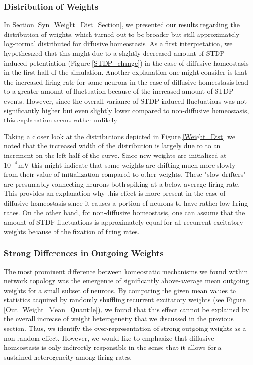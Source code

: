 \documentclass[10pt,a4paper]{article}
\begin{document}
\subsubsection{Distribution of Weights}
In Section \ref{Syn_Weight_Dist_Section}, we presented our results regarding the distribution of weights, which turned out to be broader but still approximately log-normal distributed for diffusive homeostasis. As a first interpretation, we hypothesized that this might due to a slightly decreased amount of STDP-induced potentiation (Figure \ref{STDP_change}) in the case of diffusive homeostasis in the first half of the simulation. Another explanation one might consider is that the increased firing rate for some neurons in the case of diffusive homeostasis lead to a greater amount of fluctuation because of the increased amount of STDP-events. However, since the overall variance of STDP-induced fluctuations was not significantly higher but even slightly lower compared to non-diffusive homeostasis, this explanation seems rather unlikely. 

Taking a closer look at the distributions depicted in Figure \ref{Weight_Dist} we noted that the increased width of the distribution is largely due to to an increment on the left half of the curve. Since new weights are initialized at $\mathrm{10^{-4}\, mV}$ this might indicate that some weights are drifting much more slowly from their value of initialization compared to other weights. These "slow drifters" are presumably connecting neurons both spiking at a below-average firing rate.
This provides an explanation why this effect is more present in the case of diffusive homeostasis since it causes a portion of neurons to have rather low firing rates. On the other hand, for non-diffusive homeostasis, one can assume that the amount of STDP-fluctuations is approximately equal for all recurrent excitatory weights because of the fixation of firing rates.

\subsubsection{Strong Differences in Outgoing Weights}
The most prominent difference between homeostatic mechanisms we found within network topology was the emergence of significantly above-average mean outgoing weights for a small subset of neurons. By comparing the given mean values to statistics acquired by randomly shuffling recurrent excitatory weights (see Figure \ref{Out_Weight_Mean_Quantile}), we found that this effect cannot be explained by the overall increase of weight heterogeneity that we discussed in the previous section. Thus, we identify the over-representation of strong outgoing weights as a non-random effect. However, we would like to emphasize that diffusive homeostasis is only indirectly responsible in the sense that it allows for a sustained heterogeneity among firing rates.   
\end{document}
